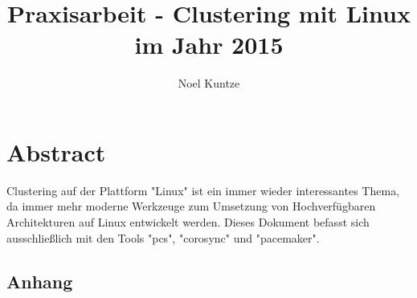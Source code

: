 \documentclass[a4paper]{article}
\begin{document}
\title{Praxisarbeit - Clustering mit Linux im Jahr 2015}
\author{Noel Kuntze }
\maketitle

\newpage
\tableofcontents
\setcounter{tocdepth}{2}

\newpage
\listoffigures

\newpage

\section*{Abstract}
Clustering auf der Plattform "Linux" ist ein immer wieder interessantes Thema, da immer mehr moderne Werkzeuge zum Umsetzung von Hochverfügbaren Architekturen auf Linux entwickelt werden. Dieses Dokument befasst sich ausschließlich mit den Tools "pcs", "corosync" und "pacemaker".
\newline

\newpage
















\newpage

\nocite{*}
{}



\newpage

\begin{appendix}

\section{Anhang}
\end{appendix}
\end{document}

